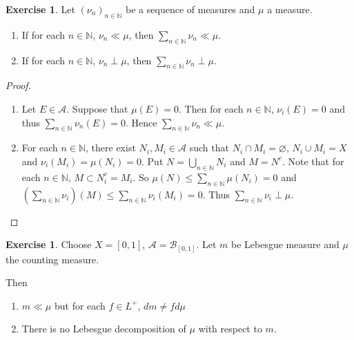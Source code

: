 \documentclass[12pt]{amsart}
\theoremstyle{definition}
\newtheorem{ex}[definition]{Exercise}
\newcommand{\N}{\mathbb{N}}
\newcommand{\MA}{\mathcal{A}}
\newcommand{\MB}{\mathcal{B}}
\newcommand{\lex}[1]{\label{ex:#1}}
\begin{document}
	\begin{ex} \lex{00000} 
		Let $(\nu_n)_{n \in \N}$ be a sequence of measures and $\mu$ a measure. 
		\begin{enumerate}
			\item If for each $n \in \N$, $\nu_n \ll \mu$, then $\sum_{n \in \N} \nu_n \ll \mu$. 
			\item If for each $n \in \N$, $\nu_n \perp \mu$, then $\sum_{n \in \N} \nu_n \perp \mu$.
		\end{enumerate} 
	\end{ex}
	
	\begin{proof}
		\begin{enumerate}
			\item Let $E \in \MA$. Suppose that $\mu(E) = 0$. Then for each $n \in \N$, $\nu_i(E) = 0$ and thus $\sum_{n \in \N} \nu_n(E) = 0$. Hence $\sum_{n \in \N} \nu_n \ll \mu$.
			\item For each $n \in \N$, there exist $N_i, M_i \in \MA$ such that $N_i \cap M_i = \varnothing$, $N_i \cup M_i = X$ and $\nu_i(M_i) = \mu(N_i) = 0$. Put $N = \bigcup_{n \in \N} N_i$ and $M = N^c$. Note that for each $n \in \N$, $M \subset N_i^c = M_i$. So $\mu(N) \leq \sum_{n \in \N} \mu(N_i) = 0$ and $(\sum_{n \in \N} \nu_i) (M) \leq \sum_{n \in \N} \nu_i(M_i) = 0$. Thus $\sum_{n \in \N} \nu_i \perp \mu$.
		\end{enumerate}
	\end{proof}
	
	
	\begin{ex} \lex{00000} 
		Choose $X = [0,1]$, $\MA = \MB_{[0,1]}$. Let $m$ be Lebesgue measure and $\mu$ the counting measure. 
		
		Then 
		\begin{enumerate}
			\item $m \ll \mu$ but for each $f \in L^+$, $dm \neq f d\mu$
			\item There is no Lebesgue decomposition of $\mu$ with respect to $m$.
		\end{enumerate}
	\end{ex}
	
\end{document}
